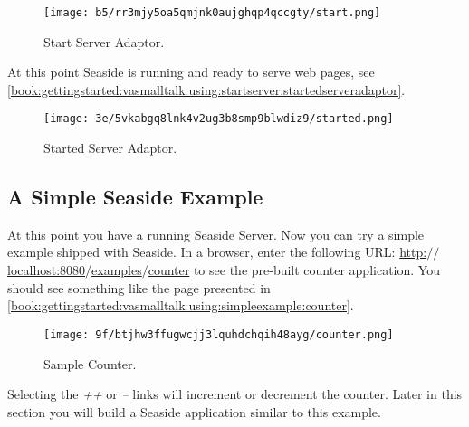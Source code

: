 \documentclass[a4paper,10pt,twoside]{book}
\begin{document}
\begin{figure}[h!tbp]
	\begin{center}
		\texttt{[image: b5/rr3mjy5oa5qmjnk0aujghqp4qccgty/start.png]}
		\caption{Start Server Adaptor.\label{book:gettingstarted:vasmalltalk:using:startserver:startserveradaptor}}
	\end{center}
\end{figure}


At this point Seaside is running and ready to serve web pages, see \autoref{book:gettingstarted:vasmalltalk:using:startserver:startedserveradaptor}.

\begin{figure}[h!tbp]
	\begin{center}
		\texttt{[image: 3e/5vkabgq8lnk4v2ug3b8smp9blwdiz9/started.png]}
		\caption{Started Server Adaptor.\label{book:gettingstarted:vasmalltalk:using:startserver:startedserveradaptor}}
	\end{center}
\end{figure}


\subsection{A Simple Seaside Example}
\label{book:gettingstarted:vasmalltalk:using:simpleexample}

At this point you have a running Seaside Server.  Now you can try a simple example shipped with Seaside.  In a browser, enter the following URL: 
 \href{http://localhost:8080/examples/counter}{http:$/$$/$localhost:8080$/$examples$/$counter} to see the pre-built counter application. You should see something like the page presented in \autoref{book:gettingstarted:vasmalltalk:using:simpleexample:counter}.

\begin{figure}[h!tbp]
	\begin{center}
		\texttt{[image: 9f/btjhw3ffugwcjj3lquhdchqih48ayg/counter.png]}
		\caption{Sample Counter.\label{book:gettingstarted:vasmalltalk:using:simpleexample:counter}}
	\end{center}
\end{figure}


Selecting the \textit{++} or \textit{--} links will increment or decrement the counter.  Later in this section you will build a Seaside application similar to this example.

\end{document}
